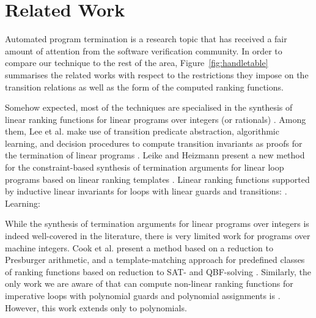 \documentclass[preprint]{sigplanconf}
\theoremstyle{definition}
\begin{document}

\section{Related Work}
Automated program termination is a research topic that has received a fair amount of attention from the software verification community.
In order to compare our technique to the rest of the area, 
Figure~\ref{fig:handletable} summarises the related works with respect to the restrictions they impose on the transition relations as well as the form of the computed ranking functions. 


Somehow expected, most of the techniques are specialised in the synthesis of linear ranking functions for linear programs over integers (or rationals) \cite{DBLP:conf/pldi/CookPR06,DBLP:conf/cav/LeeWY12,DBLP:conf/popl/Ben-AmramG13,DBLP:conf/vmcai/P04,DBLP:conf/atva/HeizmannHLP13,DBLP:conf/cav/BradleyMS05,DBLP:conf/tacas/CookSZ13}. 
Among them, 
Lee et al. make use of transition predicate abstraction, algorithmic learning, and decision procedures to compute transition
invariants as proofs for the termination of linear programs \cite{DBLP:conf/cav/LeeWY12}.
Leike and Heizmann present a new method for the constraint-based synthesis
of termination arguments for linear loop programs based on
linear ranking templates \cite{DBLP:conf/tacas/LeikeH14}.
Linear ranking functions supported by inductive linear invariants for loops with linear guards and transitions: \cite{DBLP:conf/cav/BradleyMS05}. 
Learning: \cite{DBLP:journals/corr/HeizmannHP14}



While the synthesis of termination arguments for linear programs over integers is indeed well-covered in the literature, 
there is very limited work for programs over machine integers.
Cook et al. present a method based on a reduction to Presburger
arithmetic, and a template-matching approach for predefined classes of
ranking functions based on reduction to SAT- and QBF-solving \cite{DBLP:conf/tacas/CookKRW10}.
Similarly, the only work we are aware of that can compute non-linear ranking functions  
for imperative loops with polynomial guards and polynomial assignments
is \cite{DBLP:conf/vmcai/BradleyMS05}. However, this work extends only to polynomials.
\end{document}
